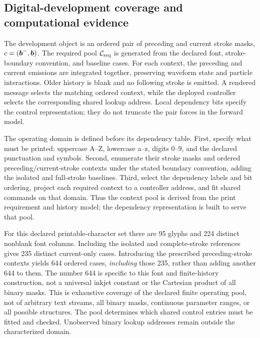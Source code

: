 \subsection{Digital-development coverage and computational evidence}\label{sec:framework_evidence}

The development object is an ordered pair of preceding and current stroke masks, $c=(\boldsymbol{b}^{-},\boldsymbol{b})$. The required pool $\mathcal C_{\rm req}$ is generated from the declared font, stroke-boundary convention, and baseline cases. For each context, the preceding and current emissions are integrated together, preserving waveform state and particle interactions. Older history is blank and no following stroke is emitted. A rendered message selects the matching ordered context, while the deployed controller selects the corresponding shared lookup address. Local dependency bits specify the control representation; they do not truncate the pair forces in the forward model.

The operating domain is defined before its dependency table. First, specify what must be printed: uppercase A--Z, lowercase a--z, digits 0--9, and the declared punctuation and symbols. Second, enumerate their stroke masks and ordered preceding/current-stroke contexts under the stated boundary convention, adding the isolated and full-stroke baselines. Third, select the dependency labels and bit ordering, project each required context to a controller address, and fit shared commands on that domain. Thus the context pool is derived from the print requirement and history model; the dependency representation is built to serve that pool.

For this declared printable-character set there are 95 glyphs and 224 distinct nonblank font columns. Including the isolated and complete-stroke references gives 235 distinct current-only cases. Introducing the prescribed preceding-stroke contexts yields 644 ordered cases, \emph{including} those 235, rather than adding another 644 to them. The number 644 is specific to this font and finite-history construction, not a universal inkjet constant or the Cartesian product of all binary masks. This is exhaustive coverage of the declared finite operating pool, not of arbitrary text streams, all binary masks, continuous parameter ranges, or all possible structures. The pool determines which shared control entries must be fitted and checked. Unobserved binary lookup addresses remain outside the characterized domain.

